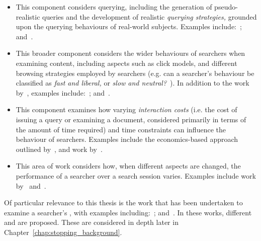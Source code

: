 \begin{itemize}
    \item{ This component considers querying, including the generation of pseudo-realistic queries and the development of realistic \emph{querying strategies,} grounded upon the querying behaviours of real-world subjects. Examples include:~\cite{azzopardi2009query_side, azzopardi2007languages, carterette2015test_collections, jordan2006cqg, keskustalo2009querying, hagen2015query_generation}; and~\cite{verberne2015personalised_queries}.}
    
    \item{ This broader component considers the wider behaviours of searchers when examining content, including aspects such as click models, and different browsing strategies employed by searchers (e.g. can a searcher's behaviour be classified as \emph{fast and liberal,} or \emph{slow and neutral?}~\citep{smucker2011user_strategies}). In addition to the work by~\cite{smucker2011user_strategies}, examples include:~\cite{carterette2015test_collections, chuklin2015click_models, guo2009click_chain}; and~\cite{pakkonen2015behavioural_dimensions}.}
    
    \item{ This component examines how varying \emph{interaction costs} (i.e. the cost of issuing a query or examining a document, considered primarily in terms of the amount of time required) and time constraints can influence the behaviour of searchers. Examples include the economics-based approach outlined by~\cite{azzopardi2011economics}, and work by~\cite{baskaya2012simulating_sessions}.}
    
    \item{ This area of work considers how, when different aspects are changed, the performance of a searcher over a search session varies. Examples include work by~\cite{luo2014winwin} and~\cite{luo2015pomdp}.}
\end{itemize}

Of particular relevance to this thesis is the work that has been undertaken to examine a searcher's , with examples including:~\cite{carterette2015test_collections, maxwell2015initial_stopping, maxwell2015stopping_strategies}; and~\cite{thomas2014modelling_behaviour}. In these works, different  and  are proposed. These are considered in depth later in Chapter~\ref{chap:stopping_background}.

